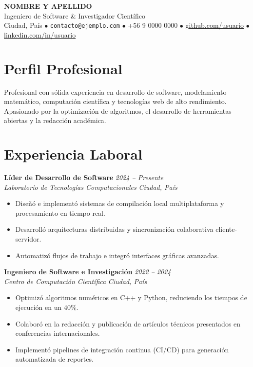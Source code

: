 \documentclass[10pt, letterpaper]{article}
\begin{document}
\pagestyle{empty}

\begin{center}
  {\Huge \bfseries \color{darkblue} NOMBRE Y APELLIDO}\\[0.2cm]
  {\Large \color{primary} Ingeniero de Software \& Investigador Científico}\\[0.3cm]
  {\small \color{lightgray}
    Ciudad, País \quad $\bullet$ \quad
    \texttt{contacto@ejemplo.com} \quad $\bullet$ \quad
    +56 9 0000 0000 \quad $\bullet$ \quad
    \href{https://github.com/usuario}{github.com/usuario} \quad $\bullet$ \quad
    \href{https://linkedin.com}{linkedin.com/in/usuario}
  }
\end{center}

\vspace{0.2cm}

\section{Perfil Profesional}
Profesional con sólida experiencia en desarrollo de software, modelamiento matemático, computación científica y tecnologías web de alto rendimiento. Apasionado por la optimización de algoritmos, el desarrollo de herramientas abiertas y la redacción académica.

\section{Experiencia Laboral}

\textbf{Líder de Desarrollo de Software} \hfill \textit{2024 -- Presente} \\
\textit{Laboratorio de Tecnologías Computacionales} \hfill \textit{Ciudad, País}
\begin{itemize}
  \item Diseñó e implementó sistemas de compilación local multiplataforma y procesamiento en tiempo real.
  \item Desarrolló arquitecturas distribuidas y sincronización colaborativa cliente-servidor.
  \item Automatizó flujos de trabajo e integró interfaces gráficas avanzadas.
\end{itemize}

\vspace{0.3cm}
\textbf{Ingeniero de Software e Investigación} \hfill \textit{2022 -- 2024} \\
\textit{Centro de Computación Científica} \hfill \textit{Ciudad, País}
\begin{itemize}
  \item Optimizó algoritmos numéricos en C++ y Python, reduciendo los tiempos de ejecución en un 40\%.
  \item Colaboró en la redacción y publicación de artículos técnicos presentados en conferencias internacionales.
  \item Implementó pipelines de integración continua (CI/CD) para generación automatizada de reportes.
\end{itemize}
\end{document}
